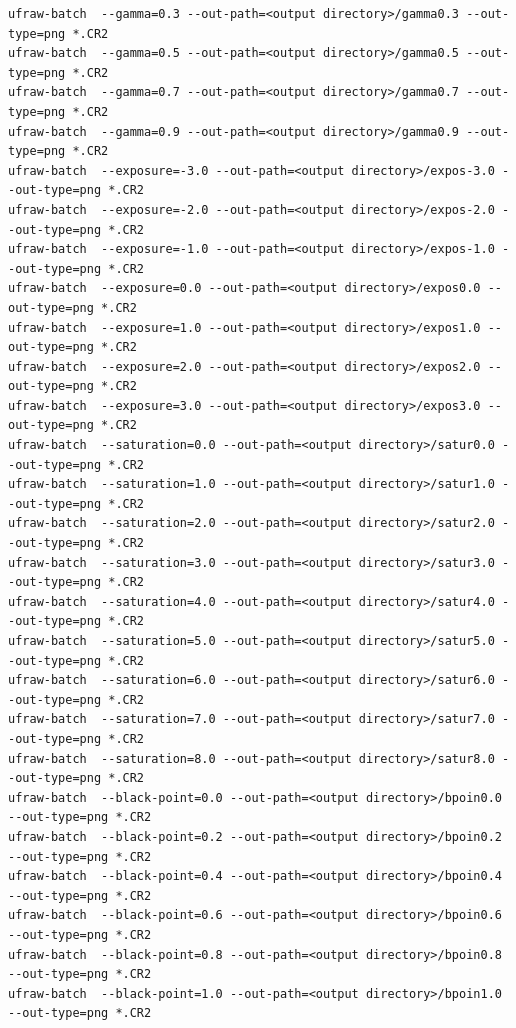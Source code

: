\documentclass{report}
\begin{document}
\begin{lstlisting}
ufraw-batch  --gamma=0.3 --out-path=<output directory>/gamma0.3 --out-type=png *.CR2
ufraw-batch  --gamma=0.5 --out-path=<output directory>/gamma0.5 --out-type=png *.CR2
ufraw-batch  --gamma=0.7 --out-path=<output directory>/gamma0.7 --out-type=png *.CR2
ufraw-batch  --gamma=0.9 --out-path=<output directory>/gamma0.9 --out-type=png *.CR2
ufraw-batch  --exposure=-3.0 --out-path=<output directory>/expos-3.0 --out-type=png *.CR2
ufraw-batch  --exposure=-2.0 --out-path=<output directory>/expos-2.0 --out-type=png *.CR2
ufraw-batch  --exposure=-1.0 --out-path=<output directory>/expos-1.0 --out-type=png *.CR2
ufraw-batch  --exposure=0.0 --out-path=<output directory>/expos0.0 --out-type=png *.CR2
ufraw-batch  --exposure=1.0 --out-path=<output directory>/expos1.0 --out-type=png *.CR2
ufraw-batch  --exposure=2.0 --out-path=<output directory>/expos2.0 --out-type=png *.CR2
ufraw-batch  --exposure=3.0 --out-path=<output directory>/expos3.0 --out-type=png *.CR2
ufraw-batch  --saturation=0.0 --out-path=<output directory>/satur0.0 --out-type=png *.CR2
ufraw-batch  --saturation=1.0 --out-path=<output directory>/satur1.0 --out-type=png *.CR2
ufraw-batch  --saturation=2.0 --out-path=<output directory>/satur2.0 --out-type=png *.CR2
ufraw-batch  --saturation=3.0 --out-path=<output directory>/satur3.0 --out-type=png *.CR2
ufraw-batch  --saturation=4.0 --out-path=<output directory>/satur4.0 --out-type=png *.CR2
ufraw-batch  --saturation=5.0 --out-path=<output directory>/satur5.0 --out-type=png *.CR2
ufraw-batch  --saturation=6.0 --out-path=<output directory>/satur6.0 --out-type=png *.CR2
ufraw-batch  --saturation=7.0 --out-path=<output directory>/satur7.0 --out-type=png *.CR2
ufraw-batch  --saturation=8.0 --out-path=<output directory>/satur8.0 --out-type=png *.CR2
ufraw-batch  --black-point=0.0 --out-path=<output directory>/bpoin0.0 --out-type=png *.CR2
ufraw-batch  --black-point=0.2 --out-path=<output directory>/bpoin0.2 --out-type=png *.CR2
ufraw-batch  --black-point=0.4 --out-path=<output directory>/bpoin0.4 --out-type=png *.CR2
ufraw-batch  --black-point=0.6 --out-path=<output directory>/bpoin0.6 --out-type=png *.CR2
ufraw-batch  --black-point=0.8 --out-path=<output directory>/bpoin0.8 --out-type=png *.CR2
ufraw-batch  --black-point=1.0 --out-path=<output directory>/bpoin1.0 --out-type=png *.CR2
\end{lstlisting}
\normalsize
\end{document}
